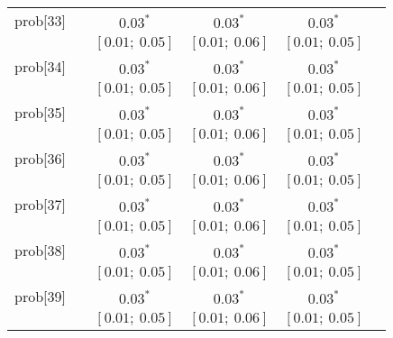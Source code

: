 \begin{table}
\begin{center}
\begin{tabular}{l c c c c c }
prob[33]    &                                  & $0.03^{*}$                & $0.03^{*}$                & $0.03^{*}$              &                         \\
            &                                  & $[0.01;\ 0.05]$           & $[0.01;\ 0.06]$           & $[0.01;\ 0.05]$         &                         \\
prob[34]    &                                  & $0.03^{*}$                & $0.03^{*}$                & $0.03^{*}$              &                         \\
            &                                  & $[0.01;\ 0.05]$           & $[0.01;\ 0.06]$           & $[0.01;\ 0.05]$         &                         \\
prob[35]    &                                  & $0.03^{*}$                & $0.03^{*}$                & $0.03^{*}$              &                         \\
            &                                  & $[0.01;\ 0.05]$           & $[0.01;\ 0.06]$           & $[0.01;\ 0.05]$         &                         \\
prob[36]    &                                  & $0.03^{*}$                & $0.03^{*}$                & $0.03^{*}$              &                         \\
            &                                  & $[0.01;\ 0.05]$           & $[0.01;\ 0.06]$           & $[0.01;\ 0.05]$         &                         \\
prob[37]    &                                  & $0.03^{*}$                & $0.03^{*}$                & $0.03^{*}$              &                         \\
            &                                  & $[0.01;\ 0.05]$           & $[0.01;\ 0.06]$           & $[0.01;\ 0.05]$         &                         \\
prob[38]    &                                  & $0.03^{*}$                & $0.03^{*}$                & $0.03^{*}$              &                         \\
            &                                  & $[0.01;\ 0.05]$           & $[0.01;\ 0.06]$           & $[0.01;\ 0.05]$         &                         \\
prob[39]    &                                  & $0.03^{*}$                & $0.03^{*}$                & $0.03^{*}$              &                         \\
            &                                  & $[0.01;\ 0.05]$           & $[0.01;\ 0.06]$           & $[0.01;\ 0.05]$         &                         \\

\end{tabular}
\end{center}
\end{table}
